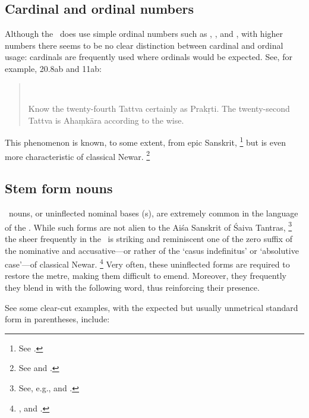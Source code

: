 
\subsection{Cardinal and ordinal numbers}

Although the \VSS\ does use simple ordinal numbers such 
as , , and , with higher 
numbers there seems to be no clear distinction between cardinal and ordinal usage:
cardinals are frequently used where ordinals would be expected.
See, for example, 20.8ab and 11ab:

\begin{quote}
\\

Know the twenty-fourth Tattva certainly as Prakṛti.
The twenty-second Tattva is Ahaṃkāra according to the wise.
\end{quote}

\noindent
This phenomenon is known, to some extent, from epic Sanskrit,%
	\footnote{See .}
but is even more characteristic of classical Newar.%
		\footnote{See  and .}



\subsection{Stem form nouns}\label{stemform}

\Stemform\ nouns, or uninflected nominal bases (s), are extremely common in the
language of the \VSS. While such forms are not alien to the Aiśa Sanskrit of Śaiva Tantras,%
		\footnote{See, e.g.,  and .}
the sheer frequently in the \VSS\ is striking and reminiscent one of the zero suffix of the nominative and accusative---or
rather of the `casus indefinitus' or `absolutive case'---of classical Newar.%
		\footnote{, and .} 
Very often, these uninflected forms are required to restore the metre, making them difficult to emend.
Moreover, they frequently they blend in  with the following word, thus reinforcing their presence.

See some clear-cut examples, with the expected but usually unmetrical standard form in parentheses, include:

